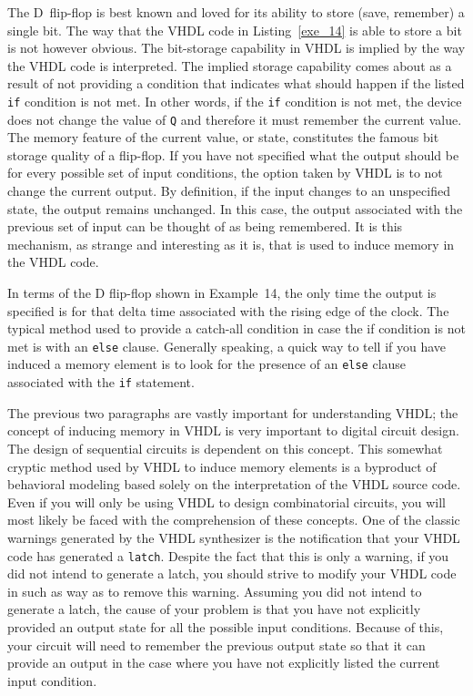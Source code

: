 The D~flip-flop is best known and loved for its ability to store (save, remember) a single bit. The way that the VHDL code in Listing~\ref{exe_14} is able to store a bit is not however obvious. The bit-storage capability in VHDL is implied by the way the VHDL code is interpreted. The implied storage capability comes about as a result of not providing a condition that indicates what should happen if the listed \texttt{if} condition is not met. In other words, if the \texttt{if} condition is not met, the device does not change the value of \texttt{Q} and therefore it must remember the current value. The memory feature of the current value, or state, constitutes the famous bit storage quality of a flip-flop. If you have not specified what the output should be for every possible set of input conditions, the option taken by VHDL is to not change the current output. By definition, if the input changes to an unspecified state, the output remains unchanged. In this case, the output associated with the previous set of input can be thought of as being remembered. It is this mechanism, as strange and interesting as it is, that is used to induce memory in the VHDL code. 

In terms of the D flip-flop shown in Example~14, the only time the output is specified is for that delta time associated with the rising edge of the clock. The typical method used to provide a catch-all condition in case the if condition is not met is with an \texttt{else} clause. Generally speaking, a quick way to tell if you have induced a memory element is to look for the presence of an \texttt{else} clause associated with the \texttt{if} statement. 

The previous two paragraphs are vastly important for understanding VHDL; the concept of inducing memory in VHDL is very important to digital circuit design. The design of sequential circuits is dependent on this concept. This somewhat cryptic method used by VHDL to induce memory elements is a byproduct of behavioral modeling based solely on the interpretation of the VHDL source code. Even if you will only be using VHDL to design combinatorial circuits, you will most likely be faced with the comprehension of these concepts. One of the classic warnings generated by the VHDL synthesizer is the notification that your VHDL code has generated a \texttt{latch}. Despite the fact that this is only a warning, if you did not intend to generate a latch, you should strive to modify your VHDL code in such as way as to remove this warning. Assuming you did not intend to generate a latch, the cause of your problem is that you have not explicitly provided an output state for all the possible input conditions. Because of this, your circuit will need to remember the previous output state so that it can provide an output in the case where you have not explicitly listed the current input condition. 

